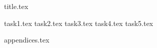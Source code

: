 \documentclass[final]{scrartcl} %
\begin{document}

{title.tex}

\newpage

\tableofcontents

\newpage
{}
{task1.tex}
{task2.tex}
{task3.tex}
{task4.tex}
{task5.tex}
\newpage
{}

\printbibliography
{appendices.tex}
\end{document}
